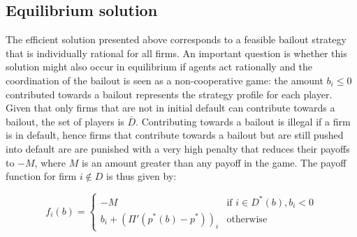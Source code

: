 \documentclass[12pt,a4paper]{article}
\begin{document}
\subsection{Equilibrium solution}
The efficient solution presented above corresponds to a feasible bailout strategy that is individually rational for all firms. An important question is whether this solution might also occur in equilibrium if agents act rationally and the coordination of the bailout is seen as a non-cooperative game: the amount $b_i \le 0$ contributed towards a bailout represents the strategy profile for each player. Given that only firms that are not in initial default can contribute towards a bailout, the set of players is $\bar{D}$. Contributing towards a bailout is illegal if a firm is in default, hence firms that contribute towards a bailout but are still pushed into default are are punished with a very high penalty that reduces their payoffs to $-M$, where $M$ is an amount greater than any payoff in the game. The payoff function for firm $i\notin D$ is thus given by:

\[
f_i (b)= \begin{cases}
-M &\mbox{if } i\in D^* (b),b_i<0 \\
b_i+(\Pi' (p^* (b)-p^* ))_i  &\mbox{otherwise}
\end{cases}
\]
\end{document}
